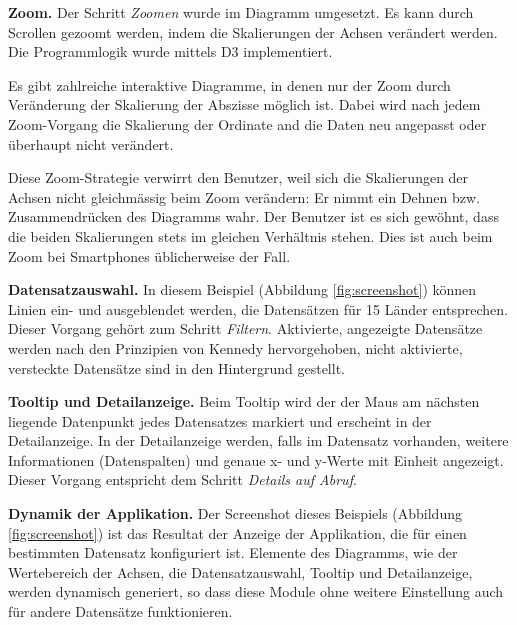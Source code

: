 \textbf{Zoom.} Der Schritt \textit{Zoomen} wurde im Diagramm umgesetzt. Es kann durch Scrollen gezoomt werden, indem die Skalierungen der Achsen verändert werden. Die Programmlogik wurde mittels D3 implementiert. 

Es gibt zahlreiche interaktive Diagramme, in denen nur der Zoom durch Veränderung der Skalierung der Abszisse möglich ist. Dabei wird nach jedem Zoom-Vorgang die Skalierung der Ordinate and die Daten neu angepasst oder überhaupt nicht verändert.

Diese Zoom-Strategie verwirrt den Benutzer, weil sich die Skalierungen der Achsen nicht gleichmässig beim Zoom verändern: Er nimmt ein Dehnen bzw. Zusammendrücken des Diagramms wahr. Der Benutzer ist es sich gewöhnt, dass die beiden Skalierungen stets im gleichen Verhältnis stehen. Dies ist auch beim Zoom bei Smartphones üblicherweise der Fall.

\textbf{Datensatzauswahl.} In diesem Beispiel (Abbildung \ref{fig:screenshot}) können Linien ein- und ausgeblendet werden, die Datensätzen für 15 Länder entsprechen. Dieser Vorgang gehört zum Schritt \textit{Filtern}. Aktivierte, angezeigte Datensätze werden nach den Prinzipien von Kennedy hervorgehoben, nicht aktivierte, versteckte Datensätze sind in den Hintergrund gestellt.

\textbf{Tooltip und Detailanzeige.} Beim Tooltip wird der der Maus am nächsten liegende Datenpunkt jedes Datensatzes markiert und erscheint in der Detailanzeige. In der Detailanzeige werden, falls im Datensatz vorhanden, weitere Informationen (Datenspalten) und genaue x- und y-Werte mit Einheit angezeigt. Dieser Vorgang entspricht dem Schritt \textit{Details auf Abruf}.

\textbf{Dynamik der Applikation.} Der Screenshot dieses Beispiels (Abbildung \ref{fig:screenshot}) ist das Resultat der Anzeige der Applikation, die für einen bestimmten Datensatz konfiguriert ist. Elemente des Diagramms, wie der Wertebereich der Achsen, die Datensatzauswahl, Tooltip und Detailanzeige, werden dynamisch generiert, so dass diese Module ohne weitere Einstellung auch für andere Datensätze funktionieren.

